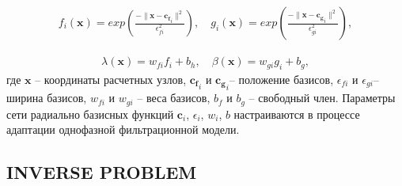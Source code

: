 \documentclass{article}
\begin{document}
\begin{eqnarray}\label{rbf}
	f_i(\mathbf{x}) = exp \left(\frac{-\lVert \mathbf{x} - \mathbf{c_f}_i \rVert^2}{\epsilon_{fi}^2}\right), \quad
	g_i(\mathbf{x}) = exp \left(\frac{-\lVert \mathbf{x} - \mathbf{c_g}_i \rVert^2}{\epsilon_{gi}^2}\right),
\end{eqnarray}

\begin{eqnarray}
	\lambda(\mathbf{x}) = w_{fi}f_i + b_h, \quad
	\beta(\mathbf{x}) = w_{gi}g_i + b_g,
\end{eqnarray}
где $\mathbf{x}$ – координаты расчетных узлов,  $\mathbf{c_f}_i$ и $\mathbf{c_g}_i$– положение базисов, $\epsilon_{fi}$ и $\epsilon_{gi}$– ширина базисов, $w_{fi}$ и $w_{gi}$ – веса базисов, $b_f$ и $b_g$ – свободный член. Параметры сети радиально базисных функций $\mathbf{c}_i$, $\epsilon_i$, $w_i$, $b$  настраиваются в процессе адаптации однофазной фильтрационной модели.

\subsection{INVERSE PROBLEM}
\end{document}

